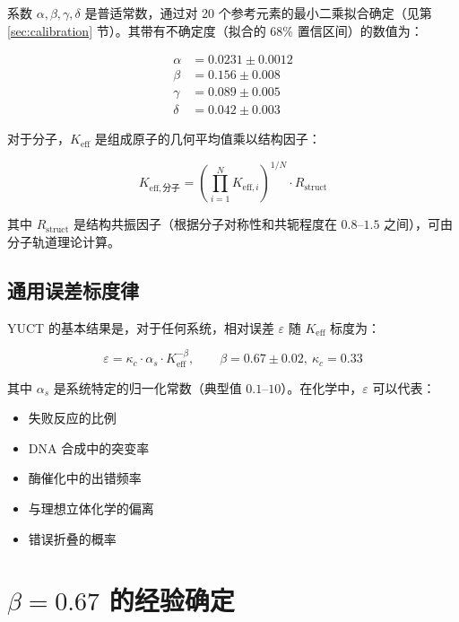 \documentclass[11pt,a4paper]{article}
\newcommand{\Keff}{K_{\mathrm{eff}}}
\newcommand{\kappac}{\kappa_c}
\newcommand{\eps}{\varepsilon}
\newcommand{\Rstruct}{R_{\mathrm{struct}}}
\begin{document}
	系数 $\alpha, \beta, \gamma, \delta$ 是普适常数，通过对 20 个参考元素的最小二乘拟合确定（见第 \ref{sec:calibration} 节）。其带有不确定度（拟合的 68\% 置信区间）的数值为：
	
	\begin{align}
		\alpha &= 0.0231 \pm 0.0012 \\
		\beta &= 0.156 \pm 0.008 \\
		\gamma &= 0.089 \pm 0.005 \\
		\delta &= 0.042 \pm 0.003
	\end{align}
	
	对于分子，$\Keff$ 是组成原子的几何平均值乘以结构因子：
	
	\begin{equation}
		K_{\mathrm{eff},\text{分子}} = \left(\prod_{i=1}^{N} K_{\mathrm{eff},i}\right)^{1/N} \cdot \Rstruct
		\label{eq:keff-molecule}
	\end{equation}
	
	其中 $\Rstruct$ 是结构共振因子（根据分子对称性和共轭程度在 $0.8$–$1.5$ 之间），可由分子轨道理论计算。
	
	\subsection{通用误差标度律}
	
	YUCT 的基本结果是，对于任何系统，相对误差 $\eps$ 随 $\Keff$ 标度为：
	
	\begin{equation}
		\boxed{\eps = \kappac \cdot \alpha_s \cdot \Keff^{-\beta}, \qquad \beta = 0.67 \pm 0.02, \ \kappac = 0.33}
		\label{eq:universal-error}
	\end{equation}
	
	其中 $\alpha_s$ 是系统特定的归一化常数（典型值 $0.1$–$10$）。在化学中，$\eps$ 可以代表：
	\begin{itemize}
		\item 失败反应的比例
		\item DNA 合成中的突变率
		\item 酶催化中的出错频率
		\item 与理想立体化学的偏离
		\item 错误折叠的概率
	\end{itemize}
	
	\section{$\beta = 0.67$ 的经验确定}
	\label{sec:empirical-beta}
	
\end{document}
